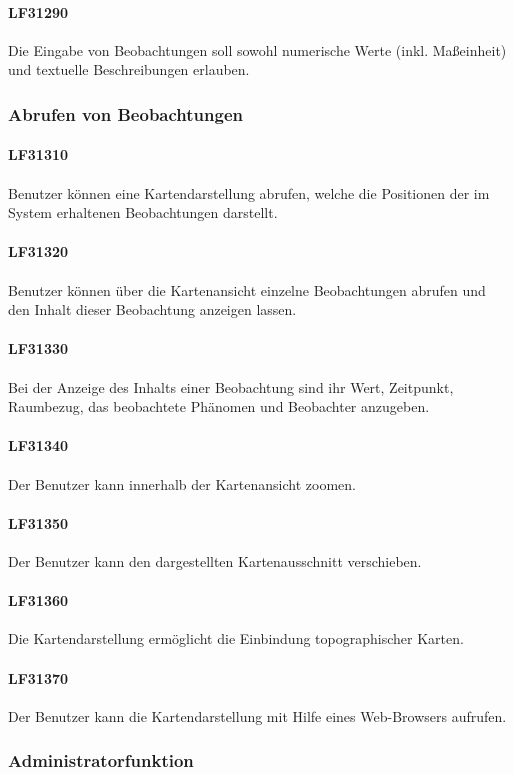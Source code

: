 \documentclass[a4paper,11pt]{scrartcl}
\begin{document}
			\paragraph{LF31290}
				Die Eingabe von Beobachtungen soll sowohl numerische Werte (inkl. Maßeinheit) und textuelle Beschreibungen erlauben.
		\subsubsection{Abrufen von Beobachtungen}
			\paragraph{LF31310}
				Benutzer können eine Kartendarstellung abrufen, welche die Positionen der im System erhaltenen Beobachtungen darstellt.
			\paragraph{LF31320}
				Benutzer können über die Kartenansicht einzelne Beobachtungen abrufen und den Inhalt dieser Beobachtung anzeigen lassen.
			\paragraph{LF31330}
				Bei der Anzeige des Inhalts einer Beobachtung sind ihr Wert, Zeitpunkt, Raumbezug, das beobachtete Phänomen und Beobachter anzugeben.
			\paragraph{LF31340}
				Der Benutzer kann innerhalb der Kartenansicht zoomen.
			\paragraph{LF31350}
				Der Benutzer kann den dargestellten Kartenausschnitt verschieben.
			\paragraph{LF31360}
				Die Kartendarstellung ermöglicht die Einbindung topographischer Karten.
			\paragraph{LF31370}
				Der Benutzer kann die Kartendarstellung mit Hilfe eines Web-Browsers aufrufen.
		\subsubsection{Administratorfunktion}
\end{document}
